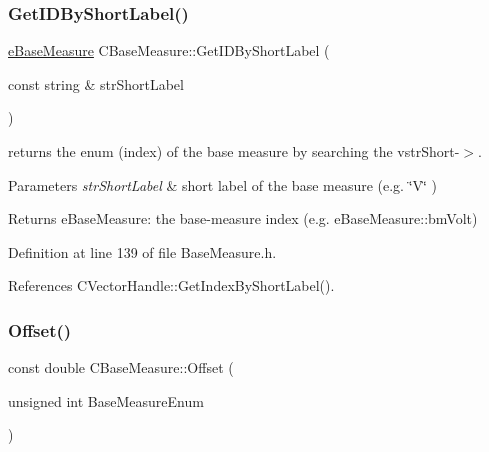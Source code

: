 \mbox{\label{classCBaseMeasure_a8476cf22a5fdcde4df0efc05cde70b45}} 
\subsubsection{\texorpdfstring{Get\+I\+D\+By\+Short\+Label()}{GetIDByShortLabel()}}
{\footnotesize\ttfamily \hyperlink{BaseMeasure_8h_ac90e5164ccf1f0d648fba7e94b229a11}{e\+Base\+Measure} C\+Base\+Measure\+::\+Get\+I\+D\+By\+Short\+Label (\begin{DoxyParamCaption}\item[{const string \&}]{str\+Short\+Label }\end{DoxyParamCaption})\hspace{0.3cm}{\ttfamily [inline]}}



returns the enum (index) of the base measure by searching the vstr\+Short-\/$>$. 


\begin{DoxyParams}{Parameters}
{\em str\+Short\+Label} & short label of the base measure (e.\+g. \char`\"{}\+V\char`\"{} ) \\
\hline
\end{DoxyParams}
\begin{DoxyReturn}{Returns}
e\+Base\+Measure\+: the base-\/measure index (e.\+g. e\+Base\+Measure\+::bm\+Volt) 
\end{DoxyReturn}


Definition at line 139 of file Base\+Measure.\+h.



References C\+Vector\+Handle\+::\+Get\+Index\+By\+Short\+Label().

\mbox{\label{classCBaseMeasure_abae752b654d90bcf0fa795cc9d4fb0ac}} 
\subsubsection{\texorpdfstring{Offset()}{Offset()}}
{\footnotesize\ttfamily const double C\+Base\+Measure\+::\+Offset (\begin{DoxyParamCaption}\item[{unsigned int}]{Base\+Measure\+Enum }\end{DoxyParamCaption})\hspace{0.3cm}{\ttfamily [inline]}}



